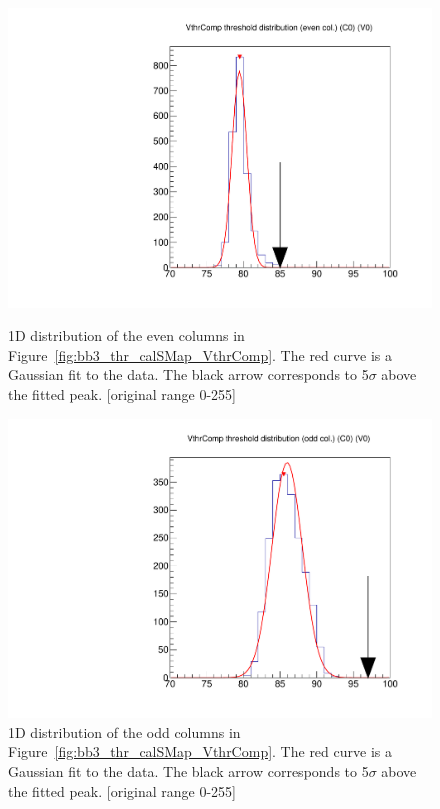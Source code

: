 \begin{figure}[!Hp]
\centering
\begin{minipage}{0.45\textwidth}
  \includegraphics[width=1.0\textwidth]{figures/bb3_dist_thr_calSMap_VthrComp_EvenCol.pdf}
  \caption{1D distribution of the even columns in Figure~\ref{fig:bb3_thr_calSMap_VthrComp}.
  The red curve is a Gaussian fit to the data.
  The black arrow corresponds to 5$\sigma$ above the fitted peak.
  [original range 0-255]}
  \label{fig:bb3_dist_thr_calSMap_VthrComp_EvenCol}
\end{minipage}
\hspace{0.3cm}
\begin{minipage}{0.45\textwidth}
  \includegraphics[width=1.0\textwidth]{figures/bb3_dist_thr_calSMap_VthrComp_OddCol.pdf}
  \caption{1D distribution of the odd columns in Figure~\ref{fig:bb3_thr_calSMap_VthrComp}.
  The red curve is a Gaussian fit to the data.
  The black arrow corresponds to 5$\sigma$ above the fitted peak.
  [original range 0-255]}
  \label{fig:bb3_dist_thr_calSMap_VthrComp_OddCol}
\end{minipage}
\end{figure}

